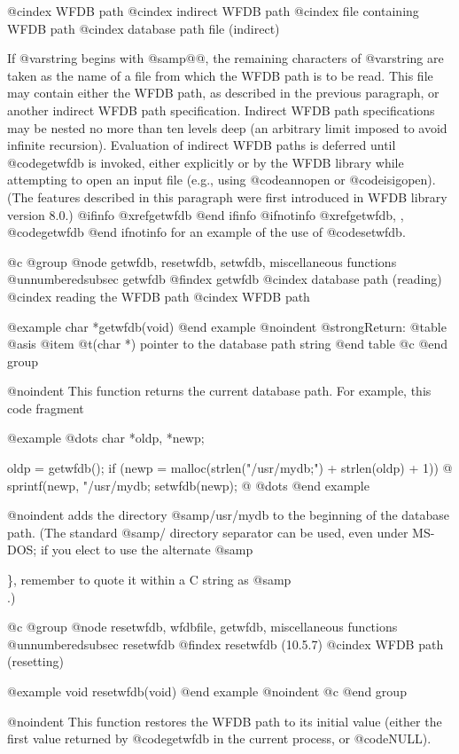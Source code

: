 {{{{{{{{@cindex WFDB path
@cindex indirect WFDB path
@cindex file containing WFDB path
@cindex database path file (indirect)

If @var{string} begins with @samp{@@}, the remaining characters of
@var{string} are taken as the name of a file from which the WFDB path is
to be read.  This file may contain either the WFDB path, as described in
the previous paragraph, or another indirect WFDB path specification.
Indirect WFDB path specifications may be nested no more than ten levels
deep (an arbitrary limit imposed to avoid infinite recursion).
Evaluation of indirect WFDB paths is deferred until @code{getwfdb} is
invoked, either explicitly or by the WFDB library while attempting to open
an input file (e.g., using @code{annopen} or @code{isigopen}).  (The
features described in this paragraph were first introduced in WFDB library
version 8.0.)
@ifinfo
@xref{getwfdb}
@end ifinfo
@ifnotinfo
@xref{getwfdb, , @code{getwfdb}}
@end ifnotinfo
for an example of the use of @code{setwfdb}.

@c @group
@node     getwfdb, resetwfdb, setwfdb, miscellaneous functions
@unnumberedsubsec getwfdb
@findex getwfdb
@cindex database path (reading)
@cindex reading the WFDB path
@cindex WFDB path

@example
char *getwfdb(void)
@end example
@noindent
@strong{Return:}
@table @asis
@item @t{(char *)}
pointer to the database path string
@end table
@c @end group

@noindent
This function returns the current database path.  For example, this code
fragment

@example
@dots{}
char *oldp, *newp;

oldp = getwfdb();
if (newp = malloc(strlen("/usr/mydb;") + strlen(oldp) + 1)) @{
    sprintf(newp, "/usr/mydb;%
    setwfdb(newp);
@}
@dots{}
@end example

@noindent
adds the directory @samp{/usr/mydb} to the beginning of the database path.
(The standard @samp{/} directory separator can be used, even under MS-DOS; if
you elect to use the alternate @samp{\}, remember to quote it within a C string
as @samp{\\}.)

@c @group
@node     resetwfdb, wfdbfile, getwfdb, miscellaneous functions
@unnumberedsubsec resetwfdb
@findex resetwfdb (10.5.7)
@cindex WFDB path (resetting)

@example
void resetwfdb(void)
@end example
@noindent
@c @end group

@noindent
This function restores the WFDB path to its initial value (either the
first value returned by @code{getwfdb} in the current process, or @code{NULL}).

}}}}}}}}}
